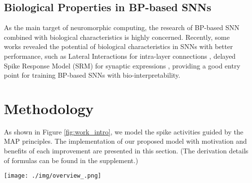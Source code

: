 \documentclass{article}
\begin{document}
\subsection{Biological Properties in BP-based SNNs}
As the main target of neuromorphic computing, the research of BP-based SNN combined with biological characteristics is highly concerned. Recently, some works revealed the potential of biological characteristics in SNNs with better performance, such as Lateral Interactions for intra-layer connections \cite{cheng_lisnn_2020}, delayed Spike Response Model (SRM) for synaptic expressions \cite{shrestha_slayer_2018}, providing a good entry point for training BP-based SNNs with bio-interpretability.









































\section{Methodology}
As shown in Figure \ref{fig:work_intro}, we model the spike activities guided by the MAP principles. The implementation of our proposed model with motivation and benefits of each improvement are presented in this section. (The derivation details of formulas can be found in the supplement.)


\begin{figure*}[htbp]
    \centering
    \texttt{[image: ./img/overview\_.png]}
    \caption{MAP-SNN overview. (a) Modeling neural model mathematically with Dendrites, Soma and Axon. The four variables , , , and   describe the input current, the membrane potential, the spike transmission, and the output current concerning time, respectively. (b) Discretized spike activities with MAP properties. (c) The spatio-temporal feedforward and backward dataflow in the proposed model. Each box of MAP-LIF indicates a certain spatio-temporal iterative state. The solid arrows indicate spatial and temporal feedforward; the red dotted arrows indicate the error backpropagation correspondingly along with the reverse directions of feedforward.
}
    \label{fig:work_intro}
\end{figure*}
\end{document}
